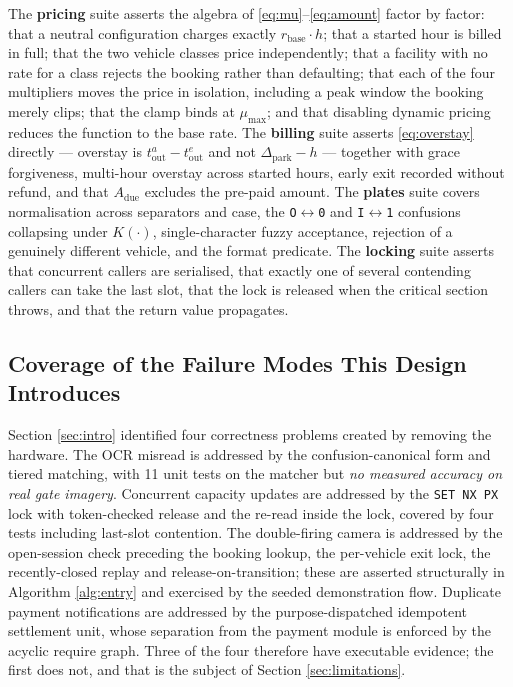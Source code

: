 \documentclass[journal,onecolumn,11pt]{IEEEtran}
\begin{document}
The \textbf{pricing} suite asserts the algebra of
\eqref{eq:mu}--\eqref{eq:amount} factor by factor: that a neutral configuration
charges exactly $r_{\text{base}} \cdot h$; that a started hour is billed in
full; that the two vehicle classes price independently; that a facility with no
rate for a class rejects the booking rather than defaulting; that each of the
four multipliers moves the price in isolation, including a peak window the
booking merely clips; that the clamp binds at $\mu_{\max}$; and that disabling
dynamic pricing reduces the function to the base rate. The \textbf{billing}
suite asserts \eqref{eq:overstay} directly --- overstay is
$t^{a}_{\text{out}} - t^{e}_{\text{out}}$ and not $\Delta_{\text{park}} - h$ ---
together with grace forgiveness, multi-hour overstay across started hours,
early exit recorded without refund, and that $A_{\text{due}}$ excludes the
pre-paid amount. The \textbf{plates} suite covers normalisation across
separators and case, the \texttt{O}$\leftrightarrow$\texttt{0} and
\texttt{I}$\leftrightarrow$\texttt{1} confusions collapsing under $K(\cdot)$,
single-character fuzzy acceptance, rejection of a genuinely different vehicle,
and the format predicate. The \textbf{locking} suite asserts that concurrent
callers are serialised, that exactly one of several contending callers can take
the last slot, that the lock is released when the critical section throws, and
that the return value propagates.

\subsection{Coverage of the Failure Modes This Design Introduces}

Section \ref{sec:intro} identified four correctness problems created by
removing the hardware. The OCR misread is addressed by the confusion-canonical
form and tiered matching, with 11 unit tests on the matcher but \emph{no
measured accuracy on real gate imagery}. Concurrent capacity updates are
addressed by the \texttt{SET NX PX} lock with token-checked release and the
re-read inside the lock, covered by four tests including last-slot contention.
The double-firing camera is addressed by the open-session check preceding the
booking lookup, the per-vehicle exit lock, the recently-closed replay and
release-on-transition; these are asserted structurally in Algorithm
\ref{alg:entry} and exercised by the seeded demonstration flow. Duplicate
payment notifications are addressed by the purpose-dispatched idempotent
settlement unit, whose separation from the payment module is enforced by the
acyclic require graph. Three of the four therefore have executable evidence;
the first does not, and that is the subject of Section \ref{sec:limitations}.
\end{document}
